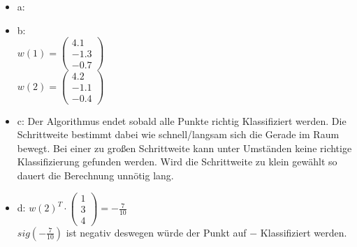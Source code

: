 \documentclass{article}
\begin{document}
\begin{itemize}
	\item a:
		\begin{figure}[h]
	\end{figure}
	\item b: \\
	$w(1) = 
	\begin{pmatrix}
		4.1\\
		-1.3\\
		-0.7
	\end{pmatrix}
	$
	\\
	$w(2) = 
	\begin{pmatrix}
		4.2\\
		-1.1\\
		-0.4
	\end{pmatrix}$
	
	\begin{figure}[h]
	\end{figure}
	
	\item c: Der Algorithmus endet sobald alle Punkte richtig Klassifiziert werden. Die Schrittweite bestimmt dabei wie schnell/langsam sich die Gerade im Raum bewegt. Bei einer zu großen Schrittweite kann unter Umständen keine richtige Klassifizierung gefunden werden. Wird die Schrittweite zu klein gewählt so dauert die Berechnung unnötig lang.
	
	\item d: $w(2)^T \cdot 
		\begin{pmatrix}
			1 \\ 3\\ 4
		\end{pmatrix} = -\frac{7}{10}$ 
		\\ $sig(-\frac{7}{10})$ ist negativ deswegen würde der Punkt auf $-$ Klassifiziert werden.	
\end{itemize}
\end{document}
